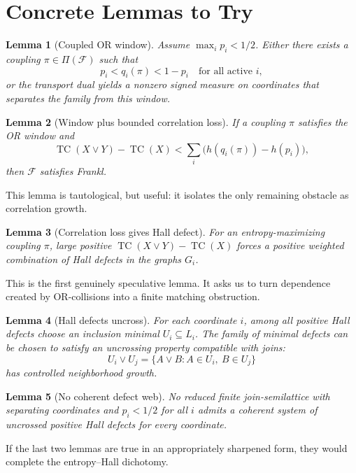 \documentclass[11pt]{article}
\newtheorem{lemma}{Lemma}
\DeclareMathOperator{\TC}{TC}
\begin{document}
\section{Concrete Lemmas to Try}

\begin{lemma}[Coupled OR window]
Assume $\max_i p_i<1/2$.  Either there exists a coupling
$\pi\in\Pi(\mathcal{F})$ such that
\[
  p_i < q_i(\pi) < 1-p_i
  \quad\text{for all active } i,
\]
or the transport dual yields a nonzero signed measure on coordinates that
separates the family from this window.
\end{lemma}

\begin{lemma}[Window plus bounded correlation loss]
If a coupling $\pi$ satisfies the OR window and
\[
  \TC(X\vee Y)-\TC(X)
  <
  \sum_i \bigl(h(q_i(\pi))-h(p_i)\bigr),
\]
then $\mathcal{F}$ satisfies Frankl.
\end{lemma}

This lemma is tautological, but useful: it isolates the only remaining
obstacle as correlation growth.

\begin{lemma}[Correlation loss gives Hall defect]
For an entropy-maximizing coupling $\pi$, large positive
$\TC(X\vee Y)-\TC(X)$ forces a positive weighted combination of Hall defects
in the graphs $G_i$.
\end{lemma}

This is the first genuinely speculative lemma.  It asks us to turn dependence
created by OR-collisions into a finite matching obstruction.

\begin{lemma}[Hall defects uncross]
For each coordinate $i$, among all positive Hall defects choose an inclusion
minimal $U_i\subseteq L_i$.  The family of minimal defects can be chosen to
satisfy an uncrossing property compatible with joins:
\[
  U_i \vee U_j
  =
  \{A\vee B:A\in U_i,\ B\in U_j\}
\]
has controlled neighborhood growth.
\end{lemma}

\begin{lemma}[No coherent defect web]
No reduced finite join-semilattice with separating coordinates and
$p_i<1/2$ for all $i$ admits a coherent system of uncrossed positive Hall
defects for every coordinate.
\end{lemma}

If the last two lemmas are true in an appropriately sharpened form, they would
complete the entropy--Hall dichotomy.
\end{document}
